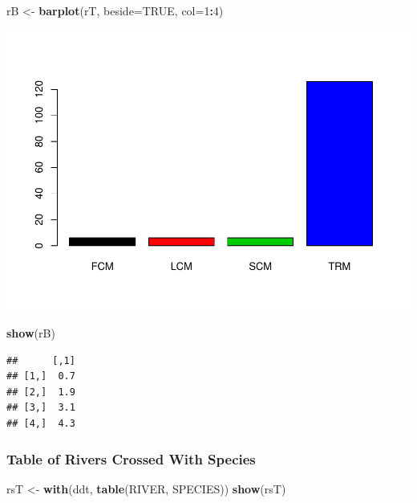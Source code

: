 \documentclass[]{article}
\newenvironment{Shaded}{\begin{snugshade}}{\end{snugshade}}
\newcommand{\KeywordTok}[1]{\textcolor[rgb]{0.13,0.29,0.53}{\textbf{#1}}}
\newcommand{\DataTypeTok}[1]{\textcolor[rgb]{0.13,0.29,0.53}{#1}}
\newcommand{\DecValTok}[1]{\textcolor[rgb]{0.00,0.00,0.81}{#1}}
\newcommand{\StringTok}[1]{\textcolor[rgb]{0.31,0.60,0.02}{#1}}
\newcommand{\OtherTok}[1]{\textcolor[rgb]{0.56,0.35,0.01}{#1}}
\newcommand{\OperatorTok}[1]{\textcolor[rgb]{0.81,0.36,0.00}{\textbf{#1}}}
\newcommand{\NormalTok}[1]{#1}
\begin{document}
\begin{Shaded}
\begin{Highlighting}[]
\NormalTok{rB <-}\StringTok{ }\KeywordTok{barplot}\NormalTok{(rT, }\DataTypeTok{beside=}\OtherTok{TRUE}\NormalTok{, }\DataTypeTok{col=}\DecValTok{1}\OperatorTok{:}\DecValTok{4}\NormalTok{)}
\end{Highlighting}
\end{Shaded}

\includegraphics{./tex2pdf.8500/43a41a44ca93297326380ebb308b4fd130fa6906.pdf}

\begin{Shaded}
\begin{Highlighting}[]
\KeywordTok{show}\NormalTok{(rB)}
\end{Highlighting}
\end{Shaded}

\begin{verbatim}
##      [,1]
## [1,]  0.7
## [2,]  1.9
## [3,]  3.1
## [4,]  4.3
\end{verbatim}

\subsubsection{Table of Rivers Crossed With
Species}\label{table-of-rivers-crossed-with-species}

\begin{Shaded}
\begin{Highlighting}[]
\NormalTok{rsT <-}\StringTok{ }\KeywordTok{with}\NormalTok{(ddt, }\KeywordTok{table}\NormalTok{(RIVER, SPECIES))}
\KeywordTok{show}\NormalTok{(rsT)}
\end{Highlighting}
\end{Shaded}
\end{document}
